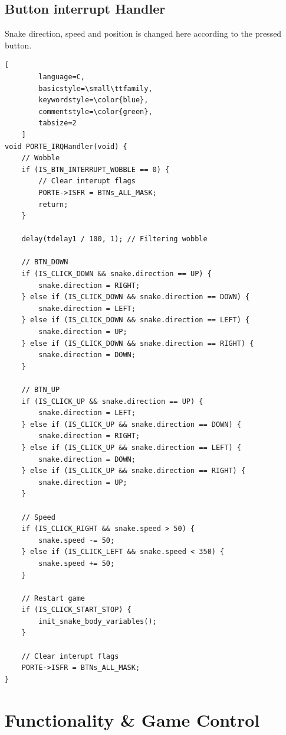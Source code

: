 \documentclass[a4paper, 11pt]{article}
\begin{document}
    \subsection{Button interrupt Handler}
    Snake direction, speed and position is changed here according to the
    pressed button.\\


    \begin{lstlisting}[
        language=C,
        basicstyle=\small\ttfamily,
        keywordstyle=\color{blue},
        commentstyle=\color{green},
        tabsize=2
    ]
void PORTE_IRQHandler(void) {
    // Wobble
    if (IS_BTN_INTERRUPT_WOBBLE == 0) {
        // Clear interupt flags
        PORTE->ISFR = BTNs_ALL_MASK;
        return;
    }

    delay(tdelay1 / 100, 1); // Filtering wobble

    // BTN_DOWN
    if (IS_CLICK_DOWN && snake.direction == UP) {
        snake.direction = RIGHT;
    } else if (IS_CLICK_DOWN && snake.direction == DOWN) {
        snake.direction = LEFT;
    } else if (IS_CLICK_DOWN && snake.direction == LEFT) {
        snake.direction = UP;
    } else if (IS_CLICK_DOWN && snake.direction == RIGHT) {
        snake.direction = DOWN;
    }

    // BTN_UP
    if (IS_CLICK_UP && snake.direction == UP) {
        snake.direction = LEFT;
    } else if (IS_CLICK_UP && snake.direction == DOWN) {
        snake.direction = RIGHT;
    } else if (IS_CLICK_UP && snake.direction == LEFT) {
        snake.direction = DOWN;
    } else if (IS_CLICK_UP && snake.direction == RIGHT) {
        snake.direction = UP;
    }

    // Speed
    if (IS_CLICK_RIGHT && snake.speed > 50) {
        snake.speed -= 50;
    } else if (IS_CLICK_LEFT && snake.speed < 350) {
        snake.speed += 50;
    }

    // Restart game
    if (IS_CLICK_START_STOP) {
        init_snake_body_variables();
    }

    // Clear interupt flags
    PORTE->ISFR = BTNs_ALL_MASK;
}
    \end{lstlisting}






    \section{Functionality \& Game Control}\label{sec:functionality}
\end{document}
